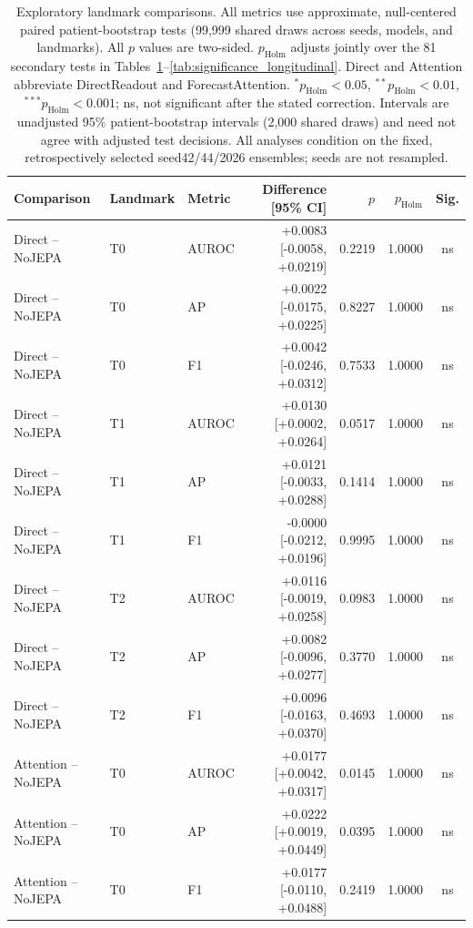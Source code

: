 \begin{table}[t]
\centering
\small
\caption{Exploratory landmark comparisons. All metrics use approximate, null-centered paired patient-bootstrap tests (99,999 shared draws across seeds, models, and landmarks). All $p$ values are two-sided. $p_{\mathrm{Holm}}$ adjusts jointly over the 81 secondary tests in Tables~\ref{tab:significance_landmarks}--\ref{tab:significance_longitudinal}. Direct and Attention abbreviate DirectReadout and ForecastAttention. $^{*}p_{\mathrm{Holm}}<0.05$, $^{**}p_{\mathrm{Holm}}<0.01$, $^{***}p_{\mathrm{Holm}}<0.001$; ns, not significant after the stated correction. Intervals are unadjusted 95\% patient-bootstrap intervals (2,000 shared draws) and need not agree with adjusted test decisions. All analyses condition on the fixed, retrospectively selected seed42/44/2026 ensembles; seeds are not resampled.}
\label{tab:significance_landmarks}
\begin{tabular}{lllrrrc}
\toprule
Comparison & Landmark & Metric & Difference [95\% CI] & $p$ & $p_{\mathrm{Holm}}$ & Sig. \\
\midrule
Direct -- NoJEPA & T0 & AUROC & +0.0083 [-0.0058, +0.0219] & 0.2219 & 1.0000 & ns \\
Direct -- NoJEPA & T0 & AP & +0.0022 [-0.0175, +0.0225] & 0.8227 & 1.0000 & ns \\
Direct -- NoJEPA & T0 & F1 & +0.0042 [-0.0246, +0.0312] & 0.7533 & 1.0000 & ns \\
Direct -- NoJEPA & T1 & AUROC & +0.0130 [+0.0002, +0.0264] & 0.0517 & 1.0000 & ns \\
Direct -- NoJEPA & T1 & AP & +0.0121 [-0.0033, +0.0288] & 0.1414 & 1.0000 & ns \\
Direct -- NoJEPA & T1 & F1 & -0.0000 [-0.0212, +0.0196] & 0.9995 & 1.0000 & ns \\
Direct -- NoJEPA & T2 & AUROC & +0.0116 [-0.0019, +0.0258] & 0.0983 & 1.0000 & ns \\
Direct -- NoJEPA & T2 & AP & +0.0082 [-0.0096, +0.0277] & 0.3770 & 1.0000 & ns \\
Direct -- NoJEPA & T2 & F1 & +0.0096 [-0.0163, +0.0370] & 0.4693 & 1.0000 & ns \\
Attention -- NoJEPA & T0 & AUROC & +0.0177 [+0.0042, +0.0317] & 0.0145 & 1.0000 & ns \\
Attention -- NoJEPA & T0 & AP & +0.0222 [+0.0019, +0.0449] & 0.0395 & 1.0000 & ns \\
Attention -- NoJEPA & T0 & F1 & +0.0177 [-0.0110, +0.0488] & 0.2419 & 1.0000 & ns \\

\end{tabular}
\end{table}

